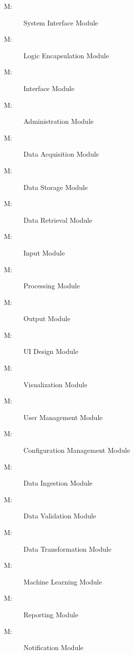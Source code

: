 \documentclass[12pt, titlepage]{article}
\newcounter{mnum}
\newcommand{\mthemnum}{M\themnum}
\begin{document}
\begin{description}
\item [ \mthemnum \label{mHH}:] System Interface Module
\item [ \mthemnum \label{mBH}:] Logic Encapsulation Module
\item [ \mthemnum \label{mIN}:] Interface Module 
\item [ \mthemnum \label{mAD}:] Administration Module 
\item [ \mthemnum \label{mDA}:] Data Acquisition Module 
\item [ \mthemnum \label{mDS}:] Data Storage Module 
\item [ \mthemnum \label{mDR}:] Data Retrieval Module 
\item [ \mthemnum \label{mINP}:] Input Module 
\item [ \mthemnum \label{mPR}:] Processing Module 
\item [ \mthemnum \label{mOU}:] Output Module 
\item [ \mthemnum \label{mUID}:] UI Design Module
\item [ \mthemnum \label{mVI}:] Visualization Module
\item [ \mthemnum \label{mUM}:] User Management Module 
\item [ \mthemnum \label{mCM}:] Configuration Management Module
\item [ \mthemnum \label{mDI}:] Data Ingestion Module
\item [ \mthemnum \label{mDV}:] Data Validation Module 
\item [ \mthemnum \label{mDT}:] Data Transformation Module 
\item [ \mthemnum \label{mML}:] Machine Learning Module
\item [ \mthemnum \label{mRE}:] Reporting Module 
\item [ \mthemnum \label{mNO}:] Notification Module
\end{description}
\end{document}

